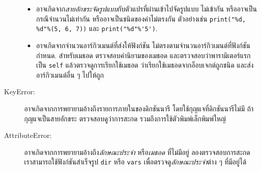\begin{description}
\begin{itemize}
\item อาจเกิดจาก\textit{สายอักขระจัดรูปแบบ}กับตัวแปรที่ผ่านเข้าไปจัดรูปแบบ ไม่เข้ากัน
หรืออาจเป็นกรณีจำนวนไม่เท่ากัน
หรืออาจเป็นชนิดของค่าไม่ตรงกัน
ตัวอย่างเช่น
\verb|print("%d, %d"%(5, 6, 7))|
และ
 \verb|print("%d"%'5')|.


\item อาจเกิดจากจำนวนอาร์กิวเมนต์ที่ส่งให้ฟังก์ชัน ไม่ตรงตามจำนวนอาร์กิวเมนต์ที่ฟังก์ชันกำหนด.
สำหรับเมธอด 
ตรวจสอบคำนิยามของเมธอด
และตรวจสอบว่าพารามิเตอร์แรก
เป็น \texttt{self}
แล้วตรวจดูการเรียกใช้เมธอด
ว่าเรียกใช้เมธอดจากอ็อบเจกต์ถูกชนิด
และส่งอาร์กิวเมนต์อื่น ๆ ไปให้ถูก

\end{itemize}

\item[KeyError:]  
%
อาจเกิดจากการพยายามอ้างถึงรายการภายในของดิกชันนารี โดยใช้กุญแจที่ดิกชันนารีไม่มี
ถ้ากุญแจเป็นสายอักขระ
ตรวจสอบดูว่าการสะกด
รวมถึงการใช้ตัวพิมพ์เล็กพิมพ์ใหญ่

\item[AttributeError:] 
%
อาจเกิดจากการพยายามอ้างถึง\textit{ลักษณะประจำ} หรือ\textit{เมธอด} ที่ไม่มีอยู่
ลองตรวจสอบการสะกด
เราสามารถใช้ฟังก์ชันสำเร็จรูป \texttt{dir} หรือ \texttt{vars} เพื่อตรวจดู\textit{ลักษณะประจำ}ต่าง ๆ ที่มีอยู่ได้


%


\end{description}
